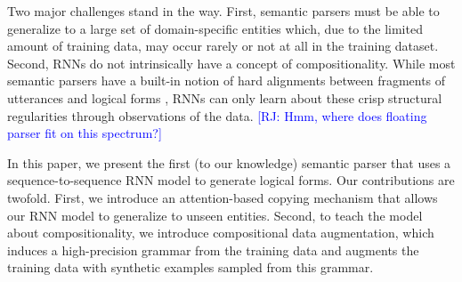\documentclass[11pt,letterpaper]{article}
\newcommand\pl[1]{\textcolor{red}{[PL: #1]}}
\newcommand\rj[1]{\textcolor{blue}{[RJ: #1]}}
\begin{document}

Two major challenges stand in the way.
First, semantic parsers must be able to generalize to a large set of 
domain-specific entities which, due to the limited
amount of training data, may occur rarely or not at all
in the training dataset.
Second, RNNs do not intrinsically have a concept of compositionality.
While most semantic parsers have a built-in notion of
hard alignments between fragments of utterances and logical forms
\cite{zettlemoyer05ccg,berant2013freebase},
RNNs can only learn about these crisp structural regularities
through observations of the data.
\rj{Hmm, where does floating parser fit on this spectrum?}


In this paper, we present the first (to our knowledge)
semantic parser that uses a sequence-to-sequence RNN model to generate
logical forms.  
Our contributions are twofold.
First, we introduce an attention-based copying mechanism 
that allows our RNN model to generalize to unseen entities.
Second, to teach the model about compositionality,
we introduce compositional data augmentation,
which induces a high-precision grammar from the training data
and augments the training data with synthetic examples sampled from this grammar.

\end{document}
